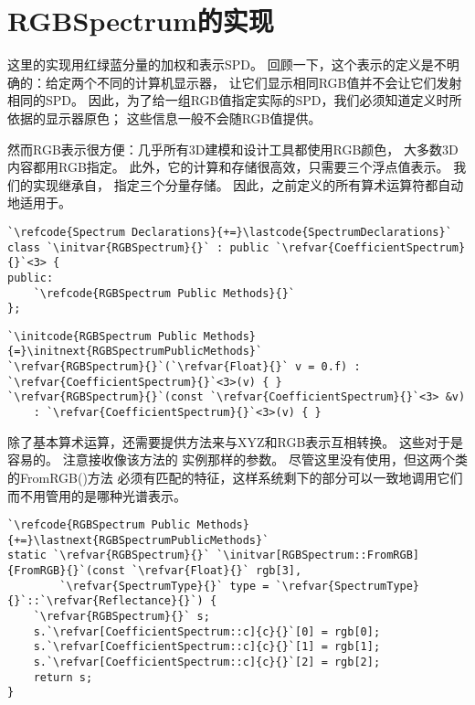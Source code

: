 \section{RGBSpectrum的实现}\label{sec:RGBSpectrum的实现}

这里的实现用红绿蓝分量的加权和表示SPD。
回顾一下，这个表示的定义是不明确的：给定两个不同的计算机显示器，
让它们显示相同RGB值并不会让它们发射相同的SPD。
因此，为了给一组RGB值指定实际的SPD，我们必须知道定义时所依据的显示器原色；
这些信息一般不会随RGB值提供。

然而RGB表示很方便：几乎所有3D建模和设计工具都使用RGB颜色，
大多数3D内容都用RGB指定。
此外，它的计算和存储很高效，只需要三个浮点值表示。
我们的实现继承自，
指定三个分量存储。
因此，之前定义的所有算术运算符都自动地适用于。
\begin{lstlisting}
`\refcode{Spectrum Declarations}{+=}\lastcode{SpectrumDeclarations}`
class `\initvar{RGBSpectrum}{}` : public `\refvar{CoefficientSpectrum}{}`<3> {
public:
    `\refcode{RGBSpectrum Public Methods}{}`
};
\end{lstlisting}
\begin{lstlisting}
`\initcode{RGBSpectrum Public Methods}{=}\initnext{RGBSpectrumPublicMethods}`
`\refvar{RGBSpectrum}{}`(`\refvar{Float}{}` v = 0.f) : `\refvar{CoefficientSpectrum}{}`<3>(v) { }
`\refvar{RGBSpectrum}{}`(const `\refvar{CoefficientSpectrum}{}`<3> &v)
    : `\refvar{CoefficientSpectrum}{}`<3>(v) { }
\end{lstlisting}

除了基本算术运算，还需要提供方法来与XYZ和RGB表示互相转换。
这些对于是容易的。
注意接收像该方法的
实例那样的参数。
尽管这里没有使用，但这两个类的{\ttfamily FromRGB()}方法
必须有匹配的特征，这样系统剩下的部分可以一致地调用它们而不用管用的是哪种光谱表示。
\begin{lstlisting}
`\refcode{RGBSpectrum Public Methods}{+=}\lastnext{RGBSpectrumPublicMethods}`
static `\refvar{RGBSpectrum}{}` `\initvar[RGBSpectrum::FromRGB]{FromRGB}{}`(const `\refvar{Float}{}` rgb[3],
        `\refvar{SpectrumType}{}` type = `\refvar{SpectrumType}{}`::`\refvar{Reflectance}{}`) {
    `\refvar{RGBSpectrum}{}` s;
    s.`\refvar[CoefficientSpectrum::c]{c}{}`[0] = rgb[0];
    s.`\refvar[CoefficientSpectrum::c]{c}{}`[1] = rgb[1];
    s.`\refvar[CoefficientSpectrum::c]{c}{}`[2] = rgb[2];
    return s;
}
\end{lstlisting}

